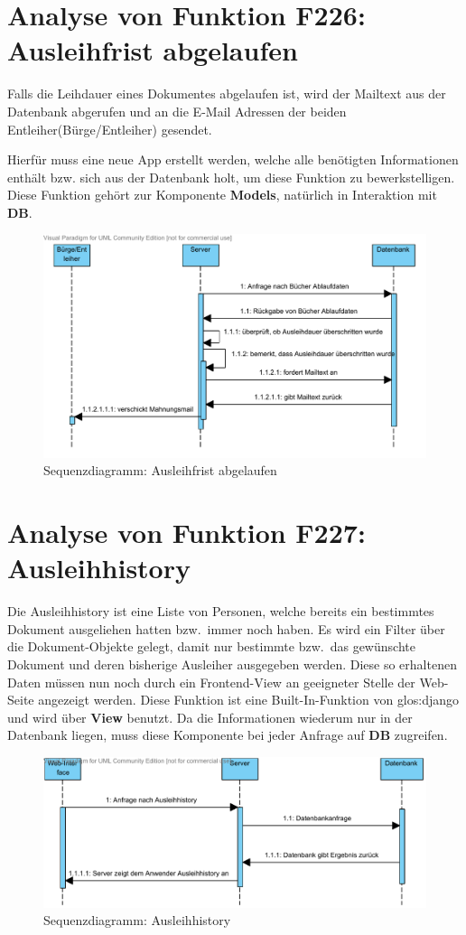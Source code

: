 \section{Analyse von Funktion F226: Ausleihfrist abgelaufen}
Falls die Leihdauer eines Dokumentes abgelaufen ist, wird der Mailtext aus der 
Datenbank abgerufen und an die E-Mail Adressen der beiden Entleiher(Bürge/Entleiher) gesendet.

Hierfür muss eine neue App erstellt werden, welche alle benötigten Informationen enthält bzw. sich aus der Datenbank holt, um diese Funktion zu bewerkstelligen.
Diese Funktion gehört zur Komponente \textbf{Models}, natürlich in Interaktion mit \textbf{DB}.
\begin{figure}[H]
\includegraphics[width=0.8\linewidth]{bilder/SeqMail.pdf}
\caption{Sequenzdiagramm: Ausleihfrist abgelaufen}
\label{fig:226}
\end{figure}

\section{Analyse von Funktion F227: Ausleihhistory}
\label{f:227}
Die Ausleihhistory ist eine Liste von Personen, welche bereits ein bestimmtes Dokument ausgeliehen hatten bzw.\ immer noch haben.
Es wird ein Filter über die Dokument-Objekte gelegt, damit nur bestimmte bzw.\ das gewünschte Dokument und deren bisherige Ausleiher ausgegeben werden. Diese so erhaltenen Daten müssen nun noch durch ein Frontend-View an geeigneter Stelle der Web-Seite angezeigt werden.
Diese Funktion ist eine Built-In-Funktion von \gls{glos:django} und wird über \textbf{View} benutzt. Da die Informationen wiederum nur in der Datenbank liegen, muss diese Komponente bei jeder Anfrage auf \textbf{DB} zugreifen.
\begin{figure}[H]
\includegraphics[width=0.8\linewidth]{bilder/F227.pdf}
\caption{Sequenzdiagramm: Ausleihhistory}
\label{fig:227}
\end{figure}

